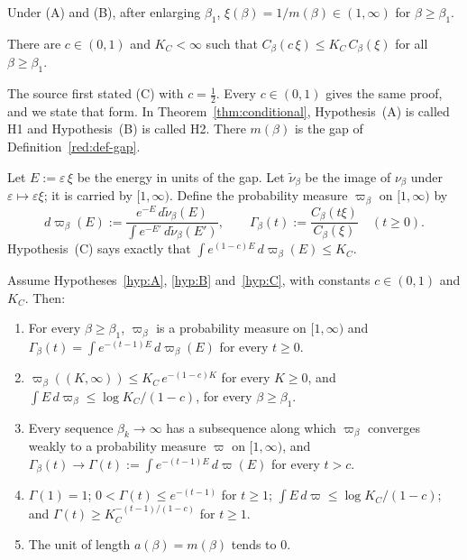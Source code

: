 Under (A) and (B), after enlarging $\beta_1$, $\xi(\beta)=1/m(\beta)\in(1,\infty)$ for $\beta\ge\beta_1$.

\begin{hypothesis}\label{hyp:C}
There are $c\in(0,1)$ and $K_C<\infty$ such that $C_\beta(c\,\xi)\le K_C\,C_\beta(\xi)$ for all $\beta\ge\beta_1$.
\end{hypothesis}

The source first stated (C) with $c=\tfrac12$. Every $c\in(0,1)$ gives the same proof, and we state that form. In Theorem~\ref{thm:conditional}, Hypothesis~(A) is called H1 and Hypothesis~(B) is called H2. There $m(\beta)$ is the gap of Definition~\ref{red:def-gap}.

Let $E:=\varepsilon\,\xi$ be the energy in units of the gap. Let $\tilde\nu_\beta$ be the image of $\nu_\beta$ under $\varepsilon\mapsto\varepsilon\xi$; it is carried by $[1,\infty)$. Define the probability measure $\varpi_\beta$ on $[1,\infty)$ by
\begin{equation}\label{red:mu}
  d\varpi_\beta(E):=\frac{e^{-E}\,d\tilde\nu_\beta(E)}{\int e^{-E'}\,d\tilde\nu_\beta(E')},
  \qquad
  \Gamma_\beta(t):=\frac{C_\beta(t\xi)}{C_\beta(\xi)}\quad(t\ge0).
\end{equation}
Hypothesis~(C) says exactly that $\int e^{(1-c)E}\,d\varpi_\beta(E)\le K_C$.

\begin{theorem}[Theorem R$'$]\label{thm:reduction}
Assume Hypotheses~\ref{hyp:A}, \ref{hyp:B} and~\ref{hyp:C}, with constants $c\in(0,1)$ and $K_C$. Then:
\begin{enumerate}
\item[(R1)] For every $\beta\ge\beta_1$, $\varpi_\beta$ is a probability measure on $[1,\infty)$ and $\Gamma_\beta(t)=\int e^{-(t-1)E}\,d\varpi_\beta(E)$ for every $t\ge0$.
\item[(R2)] $\varpi_\beta((K,\infty))\le K_C\,e^{-(1-c)K}$ for every $K\ge0$, and $\int E\,d\varpi_\beta\le \log K_C/(1-c)$, for every $\beta\ge\beta_1$.
\item[(R3)] Every sequence $\beta_k\to\infty$ has a subsequence along which $\varpi_{\beta}$ converges weakly to a probability measure $\varpi$ on $[1,\infty)$, and $\Gamma_\beta(t)\to \Gamma(t):=\int e^{-(t-1)E}\,d\varpi(E)$ for every $t>c$.
\item[(R4)] $\Gamma(1)=1$; $0<\Gamma(t)\le e^{-(t-1)}$ for $t\ge1$; $\int E\,d\varpi\le\log K_C/(1-c)$; and $\Gamma(t)\ge K_C^{-(t-1)/(1-c)}$ for $t\ge1$.
\item[(R5)] The unit of length $a(\beta)=m(\beta)$ tends to $0$.
\end{enumerate}
\end{theorem}

